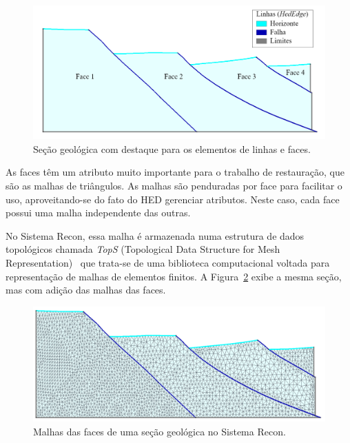 \begin{figure} [h]
  \begin{center}
    \includegraphics[width=\textwidth]{images/fig-recon-2}
    \caption{Seção geológica com destaque para os elementos de linhas e faces.}\label{fig-recon-2}
  \end{center}
\end{figure}

As faces têm um atributo muito importante para o trabalho de restauração, que são as malhas de triângulos. As malhas são penduradas por face para facilitar o uso, aproveitando-se do fato do HED gerenciar atributos. Neste caso, cada face possui uma malha independente das outras. 

No Sistema Recon, essa malha é armazenada numa estrutura de dados topológicos chamada \textit{TopS} (Topological Data Structure for Mesh Representation)~\cite{Tops} que trata-se de uma biblioteca computacional voltada para representação de malhas de elementos finitos. A Figura~\ref{fig-recon-3} exibe a mesma seção, mas com adição das malhas das faces.

\begin{figure} [H]
  \begin{center}
    \includegraphics[width=350pt]{images/fig-recon-3}
    \caption{Malhas das faces de uma seção geológica no Sistema Recon.}\label{fig-recon-3}
  \end{center}
\end{figure}

